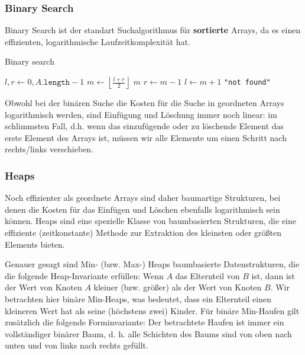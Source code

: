 \documentclass[a4paper]{article}
\begin{document}
\subsubsection{Binary Search} \label{BinarySearch}
    Binary Search ist der standart Suchalgorithmus für \textbf{sortierte} Arrays, da es einen effizienten, logarithmische Laufzeitkomplexität hat.

\begin{algorithm}
\caption{Binary search} 
\label{alg:BinarySearch}
\begin{algorithmic}[1] 
   
  \State $l, r \gets 0, A\texttt{.length}-1$
  \State $m \gets \left\lfloor \frac{l+r}{2} \right\rfloor$
  \State \Return $m$
  \State $r \gets m-1$
  \Else
  \State $l \gets m+1$
  \EndIf
  \EndWhile
  \State \Return \texttt{"not found"}
  \EndFunction
\end{algorithmic}
\end{algorithm}
Obwohl bei der binären Suche die Kosten für die Suche in geordneten Arrays logarithmisch werden, sind Einfügung und Löschung immer noch linear: im schlimmsten Fall, d.h. wenn das einzufügende oder zu löschende Element das erste Element des Arrays ist, müssen wir alle Elemente um einen Schritt nach rechts/links verschieben.

\subsubsection{Heaps}
Noch effizienter als geordnete Arrays sind daher baumartige Strukturen, bei denen die Kosten für das Einfügen und Löschen ebenfalls logarithmisch sein können. Heaps sind eine spezielle Klasse von baumbasierten Strukturen, die eine effiziente (zeitkonstante) Methode zur Extraktion des kleinsten oder größten Elements bieten.

Genauer gesagt sind Min- (bzw. Max-) Heaps baumbasierte Datenstrukturen, die die folgende Heap-Invariante erfüllen: Wenn $A$ das Elternteil von $B$ ist, dann ist der Wert von Knoten $A$ kleiner (bzw. größer) als der Wert von Knoten $B$. Wir betrachten hier binäre Min-Heaps, was bedeutet, dass ein Elternteil einen kleineren Wert hat als seine (höchstens zwei) Kinder. Für binäre Min-Haufen gilt zusätzlich die folgende Forminvariante: Der betrachtete Haufen ist immer ein vollständiger binärer Baum, d. h. alle Schichten des Baums sind von oben nach unten und von links nach rechts gefüllt.
\end{document}
